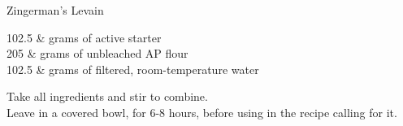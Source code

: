 \setHeadlines
{
}

\begin{recipe}
[ %
    source = Zingerman's via Jim,
]
{Zingerman's Levain}

    \ingredients
    {
		102.5 & grams of active starter \\
		205 & grams of unbleached AP flour \\
		102.5 & grams of filtered, room-temperature water \\
    }
    
    \preparation
    {
        \step Take all ingredients and stir to combine. \\
		\step Leave in a covered bowl, for 6-8 hours, before using in the recipe calling for it. 
    }

\end{recipe}
